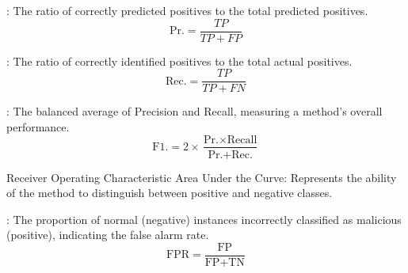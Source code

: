 : The ratio of correctly predicted positives to the total predicted positives.
\begin{equation}\label{eq30}
\text{Pr.} = \frac{TP}{TP + FP}
\end{equation}

: The ratio of correctly identified positives to the total actual positives.
\begin{equation}\label{eq31}
\text{Rec.} = \frac{TP}{TP + FN}
\end{equation}

: The balanced average of Precision and Recall, measuring a method's overall performance.
\begin{equation}\label{eq32}
\text{F1.} = 2 \times \frac{\text{Pr.} \times \text{Recall}}{\text{Pr.} + \text{Rec.}}
\end{equation}

\text Receiver Operating Characteristic Area Under the Curve: Represents the ability of the method to distinguish between positive and negative classes. 

: The proportion of normal (negative) instances incorrectly classified as malicious (positive), indicating the false alarm rate.
\begin{equation}\label{eq33}
\text{FPR} = \frac{\text{FP}}{\text{FP} + \text{TN}}
\end{equation}
